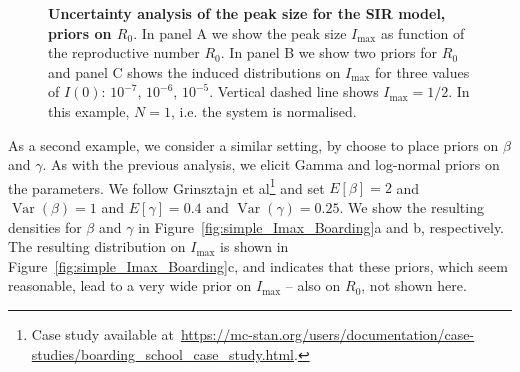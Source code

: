 \documentclass[a4paper, notitlepage, 10pt]{article}
\begin{document}
\begin{figure}[!ht]
\caption{\textbf{Uncertainty analysis of the peak size for the SIR model, priors on $R_0$}.
In panel A we show the peak size $I_{\max}$ as function of the reproductive number $R_0$.
In panel B we show two priors for $R_0$ and panel C shows the induced distributions on $I_{\max}$ for three values of $I(0)$: $10^{-7}$, $10^{-6}$, $10^{-5}$.
Vertical dashed line shows $I_{\max} = 1/2$.
In this example, $N = 1$, i.e. the system is normalised.
}
\label{fig:simple_Imax_COVID}
\end{figure}

As a second example, we consider a similar setting, by choose to place priors on $\beta$ and $\gamma$.
As with the previous analysis, we elicit Gamma and log-normal priors on the parameters.
We follow Grinsztajn et al\footnote{Case study available at~\url{https://mc-stan.org/users/documentation/case-studies/boarding_school_case_study.html}.} and set $E[\beta] = 2$ and $\operatorname{Var}(\beta) = 1$ and $E[\gamma] = 0.4$ and $\operatorname{Var}(\gamma) = 0.25$.
We show the resulting densities for $\beta$ and $\gamma$ in Figure~\ref{fig:simple_Imax_Boarding}a and b, respectively.
The resulting distribution on $I_{\max}$ is shown in Figure~\ref{fig:simple_Imax_Boarding}c, and indicates that these priors, which seem reasonable, lead to a very wide prior on $I_{\max}$  -- also on $R_0$, not shown here.
\end{document}
